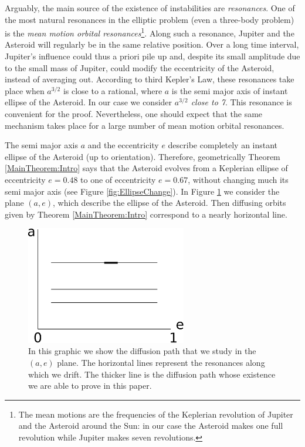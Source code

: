 Arguably, the main source of the existence of instabilities are
\emph{resonances}.  One of the most natural resonances in the
elliptic problem (even a three-body problem) is the \emph{mean motion
  orbital resonances}\footnote{The mean motions are the frequencies of
  the Keplerian revolution of Jupiter and the Asteroid around the Sun: in our case
  the Asteroid makes one full revolution while Jupiter makes seven revolutions.}.  Along such a resonance, Jupiter and the
Asteroid will regularly be in the same relative position. Over a long
time interval, Jupiter's influence could thus a priori pile up and,
despite its small amplitude due to the small mass of Jupiter, could
modify the eccentricity of the Asteroid, instead of averaging out.
According to third Kepler's Law, these resonances take place when
$a^{3/2}$ is close to a rational, where $a$ is the semi major axis of
instant ellipse of the Asteroid.  In our case we consider
\emph{$a^{3/2}$ close to 7}. This resonance is convenient for the
proof.  Nevertheless, one should expect that the same mechanism takes
place for a large number of mean motion orbital resonances.

The semi major axis $a$ and the eccentricity $e$ describe completely
an instant ellipse of the Asteroid (up to orientation).  Therefore,
geometrically Theorem \ref{MainTheorem:Intro} says that the Asteroid
evolves from a Keplerian ellipse of eccentricity $e=0.48$ to one of
eccentricity $e=0.67$, without changing much its semi major axis (see
Figure \ref{fig:EllipseChange}).  In Figure \ref{fig:a-e:diffusion} we
consider the plane $(a,e)$, which describe the ellipse of the
Asteroid.  Then diffusing orbits given by Theorem
\ref{MainTheorem:Intro} correspond to a nearly horizontal line.

\begin{figure}[h]
  \begin{center}
    \includegraphics[width=7cm]{Graphae.eps}
  \end{center}
  \caption{In this graphic we show the diffusion path that we study in
    the $(a,e)$ plane.  The horizontal lines represent the resonances
    along which we drift. The thicker line is the diffusion path whose
    existence we are able to prove in this paper.}
  \label{fig:a-e:diffusion}
\end{figure}

